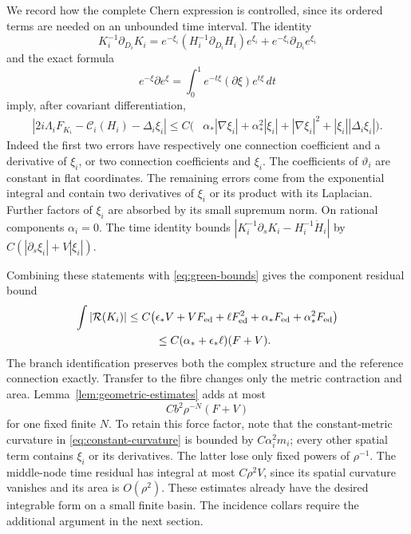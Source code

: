 We record how the complete Chern expression is controlled, since its
ordered terms are needed on an unbounded time interval. The identity
\[
 K_i^{-1}\partial_{D_i}K_i
  =e^{-\xi_i}(H_i^{-1}\partial_{D_i}H_i)e^{\xi_i}
                         +e^{-\xi_i}\partial_{D_i}e^{\xi_i}
\]
and the exact formula
\[
 e^{-\xi}\partial e^\xi
       =\int_0^1 e^{-t\xi}(\partial\xi)e^{t\xi}\,dt
\]
imply, after covariant differentiation,
\begin{equation}\label{eq:chern-remainder}
 \begin{split}
 |2i\Lambda_iF_{K_i}-\mathcal C_i(H_i)-\Delta_i\xi_i|
 \le C\bigl(&\alpha_*|\nabla\xi_i|+\alpha_*^2|\xi_i|
              +|\nabla\xi_i|^2+|\xi_i||\Delta_i\xi_i|\bigr).
 \end{split}
\end{equation}
Indeed the first two errors have respectively one connection
coefficient and a derivative of $\xi_i$, or two connection
coefficients and $\xi_i$. The coefficients of $\vartheta_i$ are
constant in flat coordinates. The remaining errors come from the
exponential integral and contain two derivatives of $\xi_i$ or its
product with its Laplacian. Further factors of $\xi_i$ are absorbed
by its small supremum norm. On rational components $\alpha_i=0$.
The time identity bounds
$|K_i^{-1}\partial_sK_i-H_i^{-1}\dot H_i|$ by
$C(|\partial_s\xi_i|+V|\xi_i|)$.

Combining these statements with \eqref{eq:green-bounds} gives the
component residual bound
\begin{equation}\label{eq:component-residual}
 \begin{split}
 \int|\mathcal R(K_i)|\le C\bigl(&\epsilon_*V+VF_{\mathrm{ed}}
                 +\ell F_{\mathrm{ed}}^2
                 +\alpha_*F_{\mathrm{ed}}
                 +\alpha_*^2F_{\mathrm{ed}}\bigr)\\
       &\le C(\alpha_*+\epsilon_*\ell)(F+V).
 \end{split}
\end{equation}
The branch identification preserves both the complex structure and
the reference connection exactly. Transfer to the fibre changes only
the metric contraction and area. Lemma~\ref{lem:geometric-estimates}
adds at most
\begin{equation}\label{eq:transfer-residual}
 Cb^2\rho^{-N}(F+V)
\end{equation}
for one fixed finite $N$. To retain this force factor, note that the
constant-metric curvature in \eqref{eq:constant-curvature} is
bounded by $C\alpha_i^2m_i$; every other spatial term contains
$\xi_i$ or its derivatives. The latter lose only fixed powers of
$\rho^{-1}$. The middle-node time residual has integral at most
$C\rho^2V$, since its spatial curvature vanishes and its area is
$O(\rho^2)$. These estimates already have the desired integrable
form on a small finite basin. The incidence collars require the
additional argument in the next section.

